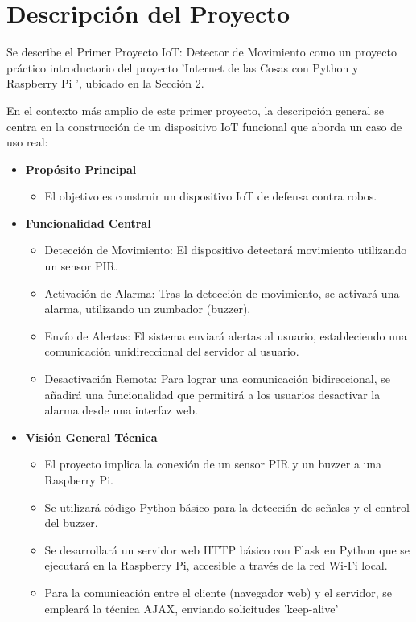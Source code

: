 \documentclass{report}
\begin{document}
\section{Descripción del Proyecto}
Se describe el Primer Proyecto IoT: Detector de Movimiento como un proyecto práctico introductorio del proyecto  'Internet de las Cosas con Python y 
Raspberry Pi ', ubicado en la Sección 2.

En el contexto más amplio de este primer proyecto, la descripción general se centra en la construcción de un dispositivo IoT funcional que aborda un 
caso de uso real:

\begin{itemize}
    \item \textbf{Propósito Principal}
    \begin{itemize}
        \item El objetivo es construir un dispositivo IoT de defensa contra robos.
    \end{itemize}
    \item \textbf{Funcionalidad Central}
    \begin{itemize}
        \item Detección de Movimiento: El dispositivo detectará movimiento utilizando un sensor PIR.
        \item Activación de Alarma: Tras la detección de movimiento, se activará una alarma, utilizando un zumbador (buzzer).
        \item Envío de Alertas: El sistema enviará alertas al usuario, estableciendo una comunicación unidireccional del servidor al usuario.
        \item Desactivación Remota: Para lograr una comunicación bidireccional, se añadirá una funcionalidad que permitirá a los usuarios desactivar la alarma 
        desde una interfaz web.
    \end{itemize}
    \item \textbf{Visión General Técnica}
    \begin{itemize}
        \item El proyecto implica la conexión de un sensor PIR y un buzzer a una Raspberry Pi.
        \item Se utilizará código Python básico para la detección de señales y el control del buzzer.
        \item Se desarrollará un servidor web HTTP básico con Flask en Python que se ejecutará en la Raspberry Pi, accesible a través de la red Wi-Fi local.
        \item Para la comunicación entre el cliente (navegador web) y el servidor, se empleará la técnica AJAX, enviando solicitudes  'keep-alive' 

\end{itemize}
\end{itemize}
\end{document}
